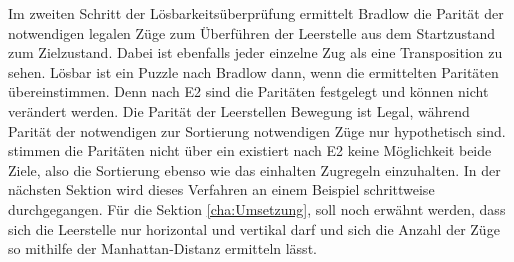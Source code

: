 Im zweiten Schritt der Lösbarkeitsüberprüfung ermittelt Bradlow die Parität der notwendigen legalen Züge zum Überführen der Leerstelle aus dem Startzustand zum Zielzustand. Dabei ist ebenfalls jeder einzelne Zug als eine Transposition zu sehen.\WNL%
Lösbar ist ein Puzzle nach Bradlow dann, wenn die ermittelten Paritäten übereinstimmen. Denn nach E2 sind die Paritäten festgelegt und können nicht verändert werden. Die Parität der Leerstellen Bewegung ist Legal, während Parität der notwendigen zur Sortierung notwendigen Züge nur hypothetisch sind. stimmen die Paritäten nicht über ein existiert nach E2 keine Möglichkeit beide Ziele, also die Sortierung ebenso wie das einhalten Zugregeln einzuhalten. 
\WNL
In der nächsten Sektion wird dieses Verfahren an einem Beispiel schrittweise durchgegangen.
\WNL
Für die Sektion \ref*{cha:Umsetzung}, soll noch erwähnt werden, dass sich die Leerstelle nur horizontal und vertikal  darf und sich die Anzahl der Züge so mithilfe der Manhattan-Distanz ermitteln lässt.

